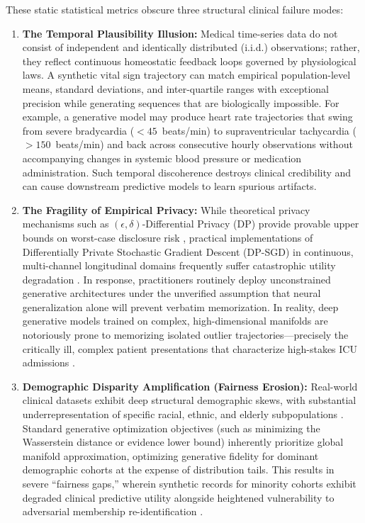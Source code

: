 \documentclass[journal]{IEEEtran}
\begin{document}
These static statistical metrics obscure three structural clinical failure modes:
\begin{enumerate}
    \item \textbf{The Temporal Plausibility Illusion:} Medical time-series data do not consist of independent and identically distributed (i.i.d.) observations; rather, they reflect continuous homeostatic feedback loops governed by physiological laws. A synthetic vital sign trajectory can match empirical population-level means, standard deviations, and inter-quartile ranges with exceptional precision while generating sequences that are biologically impossible. For example, a generative model may produce heart rate trajectories that swing from severe bradycardia ($<45$~beats/min) to supraventricular tachycardia ($>150$~beats/min) and back across consecutive hourly observations without accompanying changes in systemic blood pressure or medication administration. Such temporal discoherence destroys clinical credibility and can cause downstream predictive models to learn spurious artifacts.
    \item \textbf{The Fragility of Empirical Privacy:} While theoretical privacy mechanisms such as $(\epsilon, \delta)$-Differential Privacy (DP) provide provable upper bounds on worst-case disclosure risk \cite{dwork2014algorithmic}, practical implementations of Differentially Private Stochastic Gradient Descent (DP-SGD) in continuous, multi-channel longitudinal domains frequently suffer catastrophic utility degradation \cite{abadi2016deep}. In response, practitioners routinely deploy unconstrained generative architectures under the unverified assumption that neural generalization alone will prevent verbatim memorization. In reality, deep generative models trained on complex, high-dimensional manifolds are notoriously prone to memorizing isolated outlier trajectories---precisely the critically ill, complex patient presentations that characterize high-stakes ICU admissions \cite{carlini2019secret, stadler2022synthetic}.
    \item \textbf{Demographic Disparity Amplification (Fairness Erosion):} Real-world clinical datasets exhibit deep structural demographic skews, with substantial underrepresentation of specific racial, ethnic, and elderly subpopulations \cite{obermeyer2019dissecting}. Standard generative optimization objectives (such as minimizing the Wasserstein distance or evidence lower bound) inherently prioritize global manifold approximation, optimizing generative fidelity for dominant demographic cohorts at the expense of distribution tails. This results in severe ``fairness gaps,'' wherein synthetic records for minority cohorts exhibit degraded clinical predictive utility alongside heightened vulnerability to adversarial membership re-identification \cite{bagdasaryan2019differential}.
\end{enumerate}
\end{document}
